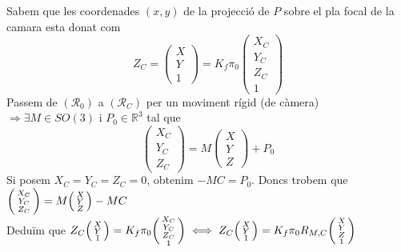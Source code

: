 \documentclass[../main.tex]{subfiles}
\begin{document}
	Sabem que les coordenades $(x,y)$ de la projecció de $P$ sobre el pla focal de la camara esta donat com
	\begin{displaymath}
		Z_C = \begin{pmatrix}X\\Y\\1\end{pmatrix} = K_f\pi_0\begin{pmatrix}X_C\\Y_C\\Z_C\\1\end{pmatrix}
	\end{displaymath}
	Passem de $(\mathcal{R}_0)$ a $(\mathcal{R}_C)$ per un moviment rígid (de càmera) $\Rightarrow \exists M \in SO(3)$ i $P_0 \in \mathbb{R}^3$ tal que
	\begin{displaymath}
		\begin{pmatrix}X_C\\Y_C\\Z_C\end{pmatrix} = M\begin{pmatrix}X\\Y\\Z\end{pmatrix} + P_0
	\end{displaymath}
	Si posem $X_C = Y_C = Z_C = 0$, obtenim $-MC = P_0$. Doncs trobem que $\begin{psmallmatrix} X_C\\Y_C\\Z_C\end{psmallmatrix} = M\begin{psmallmatrix}X\\Y\\Z\end{psmallmatrix} - MC$\\
	Deduïm que $Z_C \begin{psmallmatrix}X\\Y\\1\end{psmallmatrix} = K_f \pi_0 \begin{psmallmatrix} X_C\\Y_C\\Z_C\\1\end{psmallmatrix} \iff Z_C \begin{psmallmatrix}X\\Y\\1\end{psmallmatrix} = K_f \pi_0 R_{M,C}\begin{psmallmatrix}X\\Y\\Z\\1\end{psmallmatrix}$\\
\end{document}
